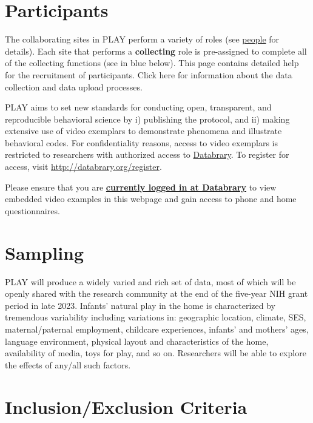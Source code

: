 \documentclass[
  12pt,
]{book}
\begin{document}
\hypertarget{participants}{%
\section{Participants}\label{participants}}

The collaborating sites in PLAY perform a variety of roles (see \protect\hyperlink{people}{people} for details). Each site that performs a \textbf{collecting} role is pre-assigned to complete all of the collecting functions (see in blue below). This page contains detailed help for the recruitment of participants. Click here for information about the data collection and data upload processes.

PLAY aims to set new standards for conducting open, transparent, and reproducible behavioral science by i) publishing the protocol, and ii) making extensive use of video exemplars to demonstrate phenomena and illustrate behavioral codes. For confidentiality reasons, access to video exemplars is restricted to researchers with authorized access to \href{http://databrary.org}{Databrary}. To register for access, visit \url{http://databrary.org/register}.

Please ensure that you are \href{https://nyu.databrary.org/user/login}{\textbf{currently logged in at Databrary}} to view embedded video examples in this webpage and gain access to phone and home questionnaires.

\hypertarget{sampling}{%
\section{Sampling}\label{sampling}}

PLAY will produce a widely varied and rich set of data, most of which will be openly shared with the research community at the end of the five-year NIH grant period in late 2023. Infants' natural play in the home is characterized by tremendous variability including variations in: geographic location, climate, SES, maternal/paternal employment, childcare experiences, infants' and mothers' ages, language environment, physical layout and characteristics of the home, availability of media, toys for play, and so on. Researchers will be able to explore the effects of any/all such factors.

\hypertarget{inclusionexclusion-criteria}{%
\section{Inclusion/Exclusion Criteria}\label{inclusionexclusion-criteria}}
\end{document}
